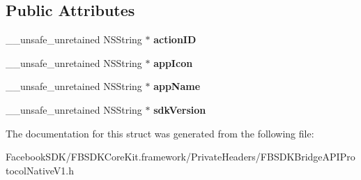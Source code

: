 \subsection*{Public Attributes}
\begin{DoxyCompactItemize}
\item 
\hypertarget{struct_f_b_s_d_k_bridge_a_p_i_protocol_native_v1_bridge_parameter_output_keys_struct_ad430bde6702e3e92977f0160704ed944}{\-\_\-\-\_\-unsafe\-\_\-unretained N\-S\-String $\ast$ {\bfseries action\-I\-D}}\label{struct_f_b_s_d_k_bridge_a_p_i_protocol_native_v1_bridge_parameter_output_keys_struct_ad430bde6702e3e92977f0160704ed944}

\item 
\hypertarget{struct_f_b_s_d_k_bridge_a_p_i_protocol_native_v1_bridge_parameter_output_keys_struct_a921462a51c740f984bc972d5109f4273}{\-\_\-\-\_\-unsafe\-\_\-unretained N\-S\-String $\ast$ {\bfseries app\-Icon}}\label{struct_f_b_s_d_k_bridge_a_p_i_protocol_native_v1_bridge_parameter_output_keys_struct_a921462a51c740f984bc972d5109f4273}

\item 
\hypertarget{struct_f_b_s_d_k_bridge_a_p_i_protocol_native_v1_bridge_parameter_output_keys_struct_a84bb5215d074ad43674af095e638f4a0}{\-\_\-\-\_\-unsafe\-\_\-unretained N\-S\-String $\ast$ {\bfseries app\-Name}}\label{struct_f_b_s_d_k_bridge_a_p_i_protocol_native_v1_bridge_parameter_output_keys_struct_a84bb5215d074ad43674af095e638f4a0}

\item 
\hypertarget{struct_f_b_s_d_k_bridge_a_p_i_protocol_native_v1_bridge_parameter_output_keys_struct_abe491a22b845414015585024f76b8c24}{\-\_\-\-\_\-unsafe\-\_\-unretained N\-S\-String $\ast$ {\bfseries sdk\-Version}}\label{struct_f_b_s_d_k_bridge_a_p_i_protocol_native_v1_bridge_parameter_output_keys_struct_abe491a22b845414015585024f76b8c24}

\end{DoxyCompactItemize}


The documentation for this struct was generated from the following file\-:\begin{DoxyCompactItemize}
\item 
Facebook\-S\-D\-K/\-F\-B\-S\-D\-K\-Core\-Kit.\-framework/\-Private\-Headers/F\-B\-S\-D\-K\-Bridge\-A\-P\-I\-Protocol\-Native\-V1.\-h\end{DoxyCompactItemize}
